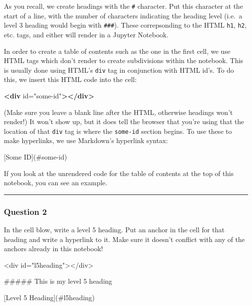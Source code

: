 \documentclass[11pt]{article}
\newenvironment{Shaded}{}{}
\newcommand{\KeywordTok}[1]{\textcolor[rgb]{0.00,0.44,0.13}{\textbf{{#1}}}}
\newcommand{\StringTok}[1]{\textcolor[rgb]{0.25,0.44,0.63}{{#1}}}
\newcommand{\OtherTok}[1]{\textcolor[rgb]{0.00,0.44,0.13}{{#1}}}
\newcommand{\FunctionTok}[1]{\textcolor[rgb]{0.02,0.16,0.49}{{#1}}}
\newcommand{\NormalTok}[1]{{#1}}
\begin{document}
As you recall, we create headings with the \texttt{\#} character. Put
this character at the start of a line, with the number of characters
indicating the heading level (i.e.~a level 3 heading would begin with
\texttt{\#\#\#}). These correpsonding to the HTML \texttt{h1},
\texttt{h2}, etc. tags, and either will render in a Jupyter Notebook.

In order to create a table of contents such as the one in the first
cell, we use HTML tags which don't render to create subdivisions within
the notebook. This is usually done using HTML's \texttt{div} tag in
conjunction with HTML id's. To do this, we insert this HTML code into
the cell:

\begin{Shaded}
\begin{Highlighting}[]
\KeywordTok{<div}\OtherTok{ id=}\StringTok{"some-id"}\KeywordTok{></div>}
\end{Highlighting}
\end{Shaded}

(Make sure you leave a blank line after the HTML, otherwise headings
won't render!) It won't show up, but it does tell the browser that
you're using that the location of that \texttt{div} tag is where the
\texttt{some-id} section begins. To use these to make hyperlinks, we use
Markdown's hyperlink syntax:

\begin{Shaded}
\begin{Highlighting}[]
\OtherTok{[Some ID](#some-id)}
\end{Highlighting}
\end{Shaded}

If you look at the unrendered code for the table of contents at the top
of this notebook, you can see an example.

    \begin{center}\rule{0.5\linewidth}{\linethickness}\end{center}

\hypertarget{question-2}{%
\subsubsection{Question 2}\label{question-2}}

In the cell blow, write a level 5 heading. Put an anchor in the cell for
that heading and write a hyperlink to it. Make sure it doesn't conflict
with any of the anchors already in this notebook!

    \begin{Shaded}
\begin{Highlighting}[]
\NormalTok{<div id="l5heading"></div>}

\FunctionTok{##### This is my level 5 heading}

\OtherTok{[Level 5 Heading](#l5heading)}
\end{Highlighting}
\end{Shaded}
\end{document}
